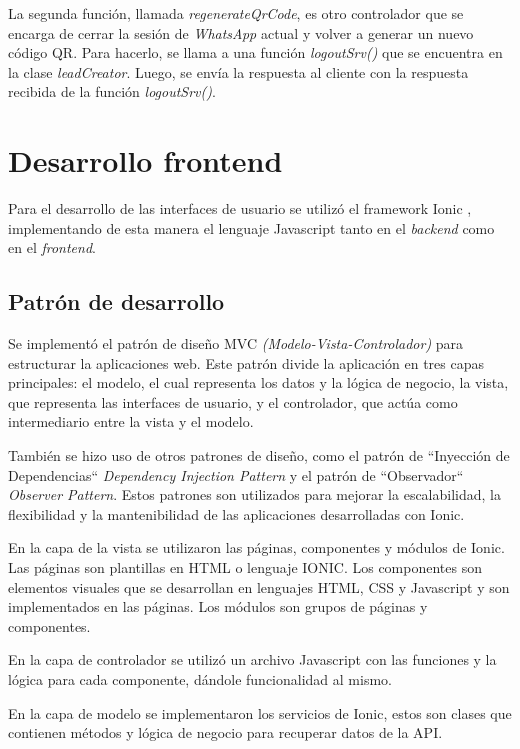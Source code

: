 La segunda función, llamada \textit{regenerateQrCode}, es otro controlador que se encarga de cerrar la sesión de \textit{WhatsApp} actual y volver a generar un nuevo código QR. Para hacerlo, se llama a una función \textit{logoutSrv()} que se encuentra en la clase \textit{leadCreator}. Luego, se envía la respuesta al cliente con la respuesta recibida de la función \textit{logoutSrv()}.


\section{Desarrollo frontend}
\label{sec:secarquitecturafrontend}
Para el desarrollo de las interfaces de usuario se utilizó el framework Ionic \cite{WEBSITE:ionic}, implementando de esta manera el lenguaje Javascript tanto en el \textit{backend} como en el \textit{frontend}.

\subsection{Patrón de desarrollo}
\label{subsec:frontpatron}

Se implementó el patrón de diseño MVC \citep{mvc} \textit{(Modelo-Vista-Controlador)} para estructurar la aplicaciones web. Este patrón divide la aplicación en tres capas principales: el modelo, el cual representa los datos y la lógica de negocio, la vista, que representa las interfaces de usuario, y el controlador, que actúa como intermediario entre la vista y el modelo.

También se hizo uso de otros patrones de diseño, como el patrón de ``Inyección de Dependencias`` \citep{dependency-injection} \textit{Dependency Injection Pattern} y el patrón de ``Observador`` \citep{observer-pattern} \textit{Observer Pattern}. Estos patrones son utilizados para mejorar la escalabilidad, la flexibilidad y la mantenibilidad de las aplicaciones desarrolladas con Ionic.

En la capa de la vista se utilizaron las páginas, componentes y módulos de Ionic. Las páginas son plantillas en HTML o lenguaje IONIC. Los componentes son elementos visuales que se desarrollan en lenguajes HTML, CSS y Javascript y son implementados en las páginas. Los módulos son grupos de páginas y componentes. 

En la capa de controlador se utilizó un archivo Javascript con las funciones y la lógica para cada componente, dándole funcionalidad al mismo. 

En la capa de modelo se implementaron los servicios de Ionic, estos son clases que contienen métodos y lógica de negocio para recuperar datos de la API. 

